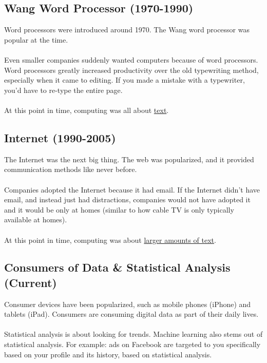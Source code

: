 \documentclass[]{article}
\theoremstyle{definition}
\begin{document}
		\subsection{Wang Word Processor (1970-1990)}
			Word processors were introduced around 1970. The Wang word processor was popular at the time.
			\\ \\
			Even smaller companies suddenly wanted computers because of word processors. Word processors greatly increased productivity over the old typewriting method, especially when it came to editing. If you made a mistake with a typewriter, you'd have to re-type the entire page.
			\\ \\
			At this point in time, computing was all about \underline{text}.
		
		\subsection{Internet (1990-2005)}
			The Internet was the next big thing. The web was popularized, and it provided communication methods like never before.
			\\ \\
			Companies adopted the Internet because it had email. If the Internet didn't have email, and instead just had distractions, companies would not have adopted it and it would be only at homes (similar to how cable TV is only typically available at homes).
			\\ \\
			At this point in time, computing was about \underline{larger amounts of text}.
		
		\subsection{Consumers of Data \& Statistical Analysis (Current)}
			Consumer devices have been popularized, such as mobile phones (iPhone) and tablets (iPad). Consumers are consuming digital data as part of their daily lives.
			\\ \\
			Statistical analysis is about looking for trends. Machine learning also stems out of statistical analysis. For example: ads on Facebook are targeted to you specifically based on your profile and its history, based on statistical analysis.
	
\end{document}
